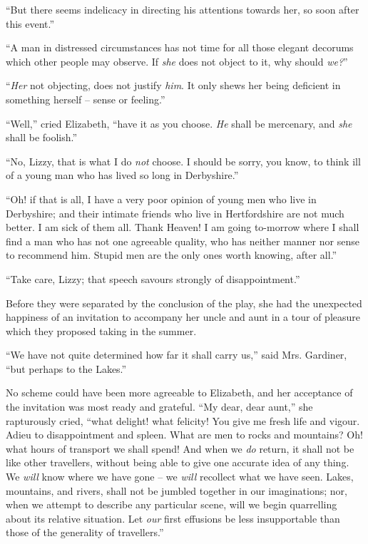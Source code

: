 “But there seems indelicacy in directing his attentions
towards her, so soon after this event.”

“A man in distressed circumstances has not time for
all those elegant decorums which other people may
observe. If \textit{she} does not object to it, why should \textit{we?}”

“\textit{Her} not objecting, does not justify \textit{him}. It only
shews her being deficient in something herself -- sense or
feeling.”

“Well,” cried Elizabeth, “have it as you choose. \textit{He}
shall be mercenary, and \textit{she} shall be foolish.”

“No, Lizzy, that is what I do \textit{not} choose. I should be
sorry, you know, to think ill of a young man who has lived
so long in Derbyshire.”

“Oh! if that is all, I have a very poor opinion of young
men who live in Derbyshire; and their intimate friends
who live in Hertfordshire are not much better. I am sick
of them all. Thank Heaven! I am going to-morrow where
I shall find a man who has not one agreeable quality, who
has neither manner nor sense to recommend him. Stupid
men are the only ones worth knowing, after all.”

“Take care, Lizzy; that speech savours strongly of
disappointment.”

Before they were separated by the conclusion of the
play, she had the unexpected happiness of an invitation
to accompany her uncle and aunt in a tour of pleasure
which they proposed taking in the summer.

“We have not quite determined how far it shall carry
us,” said Mrs. Gardiner, “but perhaps to the Lakes.”

No scheme could have been more agreeable to Elizabeth,
and her acceptance of the invitation was most ready and
grateful. “My dear, dear aunt,” she rapturously cried,
“what delight! what felicity! You give me fresh life
and vigour. Adieu to disappointment and spleen. What
are men to rocks and mountains? Oh! what hours of
transport we shall spend! And when we \textit{do} return, it shall
not be like other travellers, without being able to give
one accurate idea of any thing. We \textit{will} know where we
have gone -- we \textit{will} recollect what we have seen. Lakes,
mountains, and rivers, shall not be jumbled together in our
imaginations; nor, when we attempt to describe any
particular scene, will we begin quarrelling about its relative
situation. Let \textit{our} first effusions be less insupportable
than those of the generality of travellers.”

